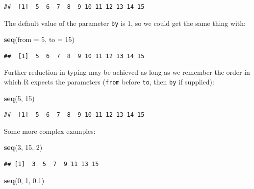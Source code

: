 \documentclass[]{book}
\makeatletter
\newenvironment{Shaded}{\begin{snugshade}}{\end{snugshade}}
\newcommand{\KeywordTok}[1]{\textcolor[rgb]{0.13,0.29,0.53}{\textbf{{#1}}}}
\newcommand{\DataTypeTok}[1]{\textcolor[rgb]{0.13,0.29,0.53}{{#1}}}
\newcommand{\DecValTok}[1]{\textcolor[rgb]{0.00,0.00,0.81}{{#1}}}
\newcommand{\FloatTok}[1]{\textcolor[rgb]{0.00,0.00,0.81}{{#1}}}
\newcommand{\NormalTok}[1]{{#1}}
\newenvironment{kframe}{%
\medskip{}
\setlength{\fboxsep}{.8em}
 \def\at@end@of@kframe{}%
 \ifinner\ifhmode%
  \def\at@end@of@kframe{\end{minipage}}%
  \begin{minipage}{\columnwidth}%
 \fi\fi%
 \def\FrameCommand##1{\hskip\@totalleftmargin \hskip-\fboxsep
 \colorbox{shadecolor}{##1}\hskip-\fboxsep
     \hskip-\linewidth \hskip-\@totalleftmargin \hskip\columnwidth}%
 \MakeFramed {\advance\hsize-\width
   \@totalleftmargin\z@ \linewidth\hsize
   \@setminipage}}%
 {\par\unskip\endMakeFramed%
 \at@end@of@kframe}
\renewenvironment{Shaded}{\begin{kframe}}{\end{kframe}}
\theoremstyle{definition}
\theoremstyle{definition}
\theoremstyle{remark}
\makeatother
\begin{document}
\begin{verbatim}
##  [1]  5  6  7  8  9 10 11 12 13 14 15
\end{verbatim}

The default value of the parameter \texttt{by} is 1, so we could get the
same thing with:

\begin{Shaded}
\begin{Highlighting}[]
\KeywordTok{seq}\NormalTok{(}\DataTypeTok{from =} \DecValTok{5}\NormalTok{, }\DataTypeTok{to =} \DecValTok{15}\NormalTok{)}
\end{Highlighting}
\end{Shaded}

\begin{verbatim}
##  [1]  5  6  7  8  9 10 11 12 13 14 15
\end{verbatim}

Further reduction in typing may be achieved as long as we remember the
order in which R expects the parameters (\texttt{from} before
\texttt{to}, then \texttt{by} if supplied):

\begin{Shaded}
\begin{Highlighting}[]
\KeywordTok{seq}\NormalTok{(}\DecValTok{5}\NormalTok{, }\DecValTok{15}\NormalTok{)}
\end{Highlighting}
\end{Shaded}

\begin{verbatim}
##  [1]  5  6  7  8  9 10 11 12 13 14 15
\end{verbatim}

Some more complex examples:

\begin{Shaded}
\begin{Highlighting}[]
\KeywordTok{seq}\NormalTok{(}\DecValTok{3}\NormalTok{, }\DecValTok{15}\NormalTok{, }\DecValTok{2}\NormalTok{)}
\end{Highlighting}
\end{Shaded}

\begin{verbatim}
## [1]  3  5  7  9 11 13 15
\end{verbatim}

\begin{Shaded}
\begin{Highlighting}[]
\KeywordTok{seq}\NormalTok{(}\DecValTok{0}\NormalTok{, }\DecValTok{1}\NormalTok{, }\FloatTok{0.1}\NormalTok{)}
\end{Highlighting}
\end{Shaded}
\end{document}
